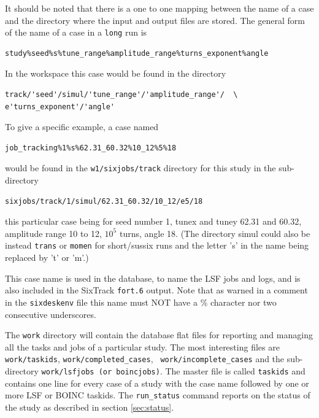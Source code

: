 \documentclass{cernatsnote}
\begin{document}
It should be noted that there is a one to one mapping between the name of a
case and the directory where the input and output files are stored. The general
form of the name of a case in a \texttt{long} run is
\begin{verbatim}
study%seed%s%tune_range%amplitude_range%turns_exponent%angle
\end{verbatim}
In the workspace this case would be found in the directory
\begin{verbatim}
track/'seed'/simul/'tune_range'/'amplitude_range'/  \
e'turns_exponent'/'angle'
\end{verbatim}
To give a specific example, a case named
\begin{verbatim}
job_tracking%1%s%62.31_60.32%10_12%5%18
\end{verbatim} would be found in the \texttt{w1/sixjobs/track} directory for 
this study in the sub-directory
\begin{verbatim}
sixjobs/track/1/simul/62.31_60.32/10_12/e5/18
\end{verbatim}
this particular case being for seed number 1, tunex and tuney 62.31 and 60.32,
amplitude range 10 to 12, $10^5$ turns, angle 18. (The directory simul could
also be instead \texttt{trans} or \texttt{momen} for short/sussix runs and the
letter 's' in the name being replaced by 't' or 'm'.)

This case name is used in the database, to name the LSF jobs and logs, and is
also included in the SixTrack \texttt{fort.6} output. Note that as warned in a
comment in the \texttt{sixdeskenv} file this name must NOT have a \% character nor
two consecutive underscores.

The \texttt{work} directory will contain the database flat files for reporting and
managing all the tasks and jobs of a particular study.  The most interesting
files are \texttt{work/taskids}, \texttt{work/completed\_cases}, {\tt
work/incomplete\_cases} and the sub-directory {\tt work/lsfjobs (or
boincjobs)}.  The master file is called \texttt{taskids} and contains one line for
every case of a study with the case name followed by one or more LSF or BOINC
taskids. The \texttt{run\_status} command reports on the status of the study as
described in section \ref{sec:status}.
\end{document}
